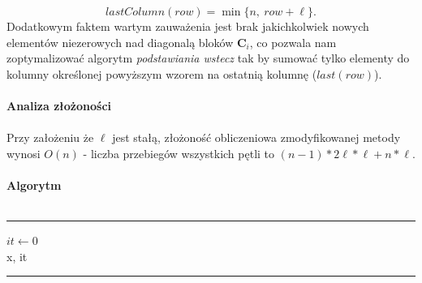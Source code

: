 \documentclass{article}
\newcommand{\mC}{\bm{C}}
\begin{document}
$$
lastColumn(row) = \min\{n,~row + \ell\}.
$$
\indent Dodatkowym faktem wartym zauważenia jest brak jakichkolwiek nowych elementów niezerowych nad diagonalą bloków $\mC_i$, co pozwala nam zoptymalizować algorytm \textit{podstawiania wstecz} tak by sumować tylko elementy do kolumny określonej powyższym wzorem na ostatnią kolumnę ($last(row)$).\\\\
\noindent \textbf{Analiza złożoności}\\\\
\indent Przy założeniu że $\ell$ jest stałą, złożoność obliczeniowa zmodyfikowanej metody wynosi $O(n)$ - liczba przebiegów wszystkich pętli to $(n-1)*2\ell*\ell+n*\ell$.\\\\
\noindent \textbf{Algorytm}\\\\
\rule{\textwidth}{0.4pt}
\begin{algorithm}[H]
	\vspace{0.3cm}
	$it \gets 0$\\
	\Return x, it
\end{algorithm}
\hrule
\newpage
\end{document}
